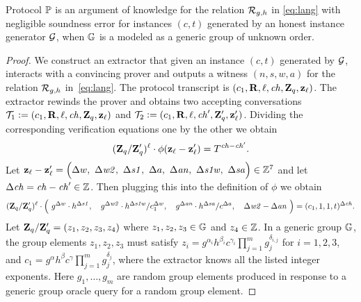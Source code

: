 \documentclass[11pt]{article}
\begin{document}
\begin{theorem}
Protocol $\mathbb{{P}}$ is an argument of knowledge
for the relation ${\cal R}_{g,h}$ in \eqref{eq:lang} with negligible
soundness error for instances $(c,t)$ generated by an honest instance
generator ${\cal G}$,
when $\mathbb G$ is a modeled as a generic group of unknown order. 
\end{theorem}

\begin{proof}
We construct an extractor that given an instance $(c,t)$ 
generated by ${\cal G}$,
interacts with a convincing prover and outputs a witness $(n, s, w, a)$ 
for the relation ${\cal R}_{g,h}$ in~\eqref{eq:lang}. 
The protocol transcript is $(c_1, \mathbf{R}, \ell, \mathit{ch}, \mathbf{Z}_q, \mathbf{z}_\ell)$.
The extractor rewinds the prover and obtains two
accepting conversations
${\cal T}_1 \mathrel{\mathop:}= (c_1, \mathbf{R}, \ell, \mathit{ch}, \mathbf{Z}_q, \mathbf{z}_\ell)$
and 
${\cal T}_2 \mathrel{\mathop:}= (c_1, \mathbf{R}, \ell, \mathit{ch}', \mathbf{Z}_q', \mathbf{z}_\ell')$.
Dividing the corresponding verification equations one by the other
we obtain
\[   (\mathbf{Z}_q / \mathbf{Z}_q')^\ell \cdot \phi(\mathbf{z}_\ell - \mathbf{z}_\ell') = 
          T^{\mathit{ch} - \mathit{ch}'}. \]
Let $\zv_\ell - \zv_\ell' = \Big(\Delta w,\ \Delta \mathit{w2},\ \Delta \mathit{s1},\ \Delta a,\ \Delta \mathit{an},\ \Delta \mathit{s1w},\ \Delta \mathit{sa} \Big) \in \ZZ^7$ and let $\Delta \mathit{ch} = \mathit{ch} - \mathit{ch}' \in \mathbb Z$.
Then plugging this into the definition of $\phi$ we obtain
\begin{equation} \label{eq:messy}
      (\Zv_q / \Zv_q')^\ell \cdot
      \Bigl(\ 
       g^{\Delta w} \cdot h^{\Delta \mathit{s1}},\ \ \ 
       g^{\Delta \mathit{w2}} \cdot h^{\Delta \mathit{s1w}} / c_1^{\Delta w},\ \ \ 
       g^{\Delta \mathit{an}} \cdot h^{\Delta \mathit{sa}} / c^{\Delta a},\ \ \ 
       \Delta \mathit{w2} - \Delta \mathit{an}\ \Bigr)
          = (c_1, 1, 1, t)^{\Delta \mathit{ch}}.
\end{equation}
Let $\mathbf{Z}_q / \mathbf{Z}_q' = (z_1,z_2,z_3,z_4)$ 
where $z_1,z_2,z_3 \in \mathbb G$ and $z_4 \in \mathbb Z$.  
In a generic group $\mathbb G$, the group elements $z_1,z_2,z_3$ 
must satisfy $z_i = g^{\alpha_i} h^{\beta_i} c^{\gamma_i} \prod_{j=1}^m g_j^{\delta_{i,j}}$
for $i=1,2,3$, 
and $c_1 = g^{\alpha} h^{\beta} c^\gamma \prod_{j=1}^m g_j^{\delta_{j}}$,
where the extractor knows all the listed integer exponents.
Here $g_1,\ldots,g_m$ are random group elements produced in response
to a generic group oracle query for a random group element. 


\end{proof}
\end{document}
